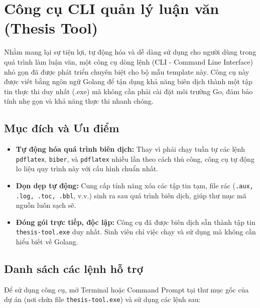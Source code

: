 \chapter{Công cụ CLI quản lý luận văn (Thesis Tool)}
\label{appendix:cli-tool}

Nhằm mang lại sự tiện lợi, tự động hóa và dễ dàng sử dụng cho người dùng trong quá trình làm luận văn, một công cụ dòng lệnh (CLI - Command Line Interface) nhỏ gọn đã được phát triển chuyên biệt cho bộ mẫu template này. Công cụ này được viết bằng ngôn ngữ Golang để tận dụng khả năng biên dịch thành một tập tin thực thi duy nhất (.exe) mà không cần phải cài đặt môi trường Go, đảm bảo tính nhẹ gọn và khả năng thực thi nhanh chóng.

\section{Mục đích và Ưu điểm}
\begin{itemize}
    \item \textbf{Tự động hóa quá trình biên dịch:} Thay vì phải chạy tuần tự các lệnh \texttt{pdflatex}, \texttt{biber}, và \texttt{pdflatex} nhiều lần theo cách thủ công, công cụ tự động lo liệu quy trình này với cấu hình chuẩn nhất.
    \item \textbf{Dọn dẹp tự động:} Cung cấp tính năng xóa các tập tin tạm, file rác (\texttt{.aux, .log, .toc, .bbl}, v.v.) sinh ra sau quá trình biên dịch, giúp thư mục mã nguồn luôn sạch sẽ.
    \item \textbf{Đóng gói trực tiếp, độc lập:} Công cụ đã được biên dịch sẵn thành tập tin \texttt{thesis-tool.exe} duy nhất. Sinh viên chỉ việc chạy và sử dụng mà không cần hiểu biết về Golang.
\end{itemize}

\section{Danh sách các lệnh hỗ trợ}
Để sử dụng công cụ, mở Terminal hoặc Command Prompt tại thư mục gốc của dự án (nơi chứa file \texttt{thesis-tool.exe}) và sử dụng các lệnh sau:

